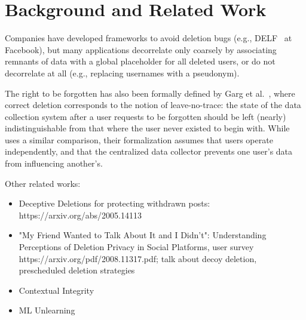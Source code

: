 \section{Background and Related Work}

Companies have developed frameworks to avoid deletion bugs (e.g., DELF~\cite{delf} at Facebook), but many
applications decorrelate only coarsely by associating remnants of data with a global placeholder for
all deleted users, or do not decorrelate at all (e.g., replacing usernames with a pseudonym).


The right to be forgotten has also been formally defined by Garg et
al.~\cite{garg}, where correct deletion corresponds to the notion of
leave-no-trace: the state of the data collection system after a user requests to be forgotten should
be left (nearly) indistinguishable from that where the user never existed to begin with. While
\sys{} uses a similar comparison, their formalization assumes that users operate
independently, and that the centralized data collector prevents one user's data from influencing
another's.

Other related works:
\begin{itemize}
    \item Deceptive Deletions for protecting withdrawn posts: https://arxiv.org/abs/2005.14113
    \item "My Friend Wanted to Talk About It and I Didn't": Understanding Perceptions of
        Deletion Privacy in Social Platforms, user survey https://arxiv.org/pdf/2008.11317.pdf;
        talk about decoy deletion, prescheduled deletion strategies~\cite{myfw}
    \item Contextual Integrity
    \item ML Unlearning
\end{itemize}

